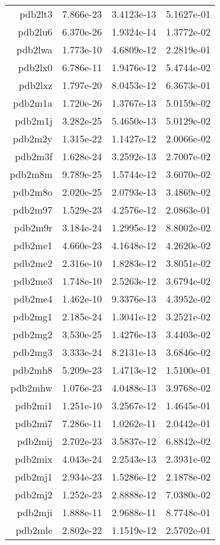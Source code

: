 \begin{xltabular}{\textwidth}{||rS[table-format=1.3e+2]S[table-format=1.4e+2]S[table-format=1.4e+2]||}
pdb2lt3 & 7.866e-23 & 3.4123e-13 & 5.1627e-01 \\
pdb2lu6 & 6.370e-26 & 1.9324e-14 & 1.3772e-02 \\
pdb2lwa & 1.773e-10 & 4.6809e-12 & 2.2819e-01 \\
pdb2lx0 & 6.786e-11 & 1.9476e-12 & 5.4744e-02 \\
pdb2lxz & 1.797e-20 & 8.0453e-12 & 6.3673e-01 \\
pdb2m1a & 1.720e-26 & 1.3767e-13 & 5.0159e-02 \\
pdb2m1j & 3.282e-25 & 5.4650e-13 & 5.0129e-02 \\
pdb2m2y & 1.315e-22 & 1.1427e-12 & 2.0066e-02 \\
pdb2m3f & 1.628e-24 & 3.2592e-13 & 2.7007e-02 \\
pdb2m8m & 9.789e-25 & 1.5744e-12 & 3.6070e-02 \\
pdb2m8o & 2.020e-25 & 2.0793e-13 & 3.4869e-02 \\
pdb2m97 & 1.529e-23 & 4.2576e-12 & 2.0863e-01 \\
pdb2m9r & 3.184e-24 & 1.2995e-12 & 8.8002e-02 \\
pdb2me1 & 4.660e-23 & 4.1648e-12 & 4.2620e-02 \\
pdb2me2 & 2.316e-10 & 1.8283e-12 & 3.8051e-02 \\
pdb2me3 & 1.748e-10 & 2.5263e-12 & 3.6794e-02 \\
pdb2me4 & 1.462e-10 & 9.3376e-13 & 4.3952e-02 \\
pdb2mg1 & 2.185e-24 & 1.3041e-12 & 3.2521e-02 \\
pdb2mg2 & 3.530e-25 & 1.4276e-13 & 3.4403e-02 \\
pdb2mg3 & 3.333e-24 & 8.2131e-13 & 3.6846e-02 \\
pdb2mh8 & 5.209e-23 & 1.4713e-12 & 1.5100e-01 \\
pdb2mhw & 1.076e-23 & 4.0488e-13 & 3.9768e-02 \\
pdb2mi1 & 1.251e-10 & 3.2567e-12 & 1.4645e-01 \\
pdb2mi7 & 7.286e-11 & 1.0262e-11 & 2.0442e-01 \\
pdb2mij & 2.702e-23 & 3.5837e-12 & 6.8842e-02 \\
pdb2mix & 4.043e-24 & 2.2543e-13 & 2.3931e-02 \\
pdb2mj1 & 2.934e-23 & 1.5286e-12 & 2.1878e-02 \\
pdb2mj2 & 1.252e-23 & 2.8888e-12 & 7.0380e-02 \\
pdb2mji & 1.888e-11 & 2.9688e-11 & 8.7748e-01 \\
pdb2mle & 2.802e-22 & 1.1519e-12 & 2.5702e-01 \\

\end{xltabular}
